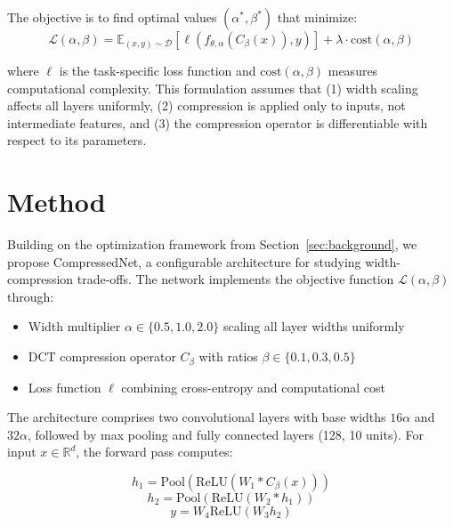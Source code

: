 \documentclass{article} %
\begin{document}
The objective is to find optimal values $(\alpha^*, \beta^*)$ that minimize:
\begin{equation}
    \mathcal{L}(\alpha, \beta) = \mathbb{E}_{(x,y)\sim\mathcal{D}}[\ell(f_{\theta,\alpha}(C_\beta(x)), y)] + \lambda \cdot \text{cost}(\alpha, \beta)
\end{equation}

where $\ell$ is the task-specific loss function and $\text{cost}(\alpha, \beta)$ measures computational complexity. This formulation assumes that (1) width scaling affects all layers uniformly, (2) compression is applied only to inputs, not intermediate features, and (3) the compression operator is differentiable with respect to its parameters.

\section{Method}
\label{sec:method}

Building on the optimization framework from Section~\ref{sec:background}, we propose CompressedNet, a configurable architecture for studying width-compression trade-offs. The network implements the objective function $\mathcal{L}(\alpha, \beta)$ through:

\begin{itemize}
    \item Width multiplier $\alpha \in \{0.5, 1.0, 2.0\}$ scaling all layer widths uniformly
    \item DCT compression operator $C_\beta$ with ratios $\beta \in \{0.1, 0.3, 0.5\}$
    \item Loss function $\ell$ combining cross-entropy and computational cost
\end{itemize}

The architecture comprises two convolutional layers with base widths $16\alpha$ and $32\alpha$, followed by max pooling and fully connected layers (128, 10 units). For input $x \in \mathbb{R}^d$, the forward pass computes:

\begin{equation}
    h_1 = \text{Pool}(\text{ReLU}(W_1 * C_\beta(x)))
\end{equation}
\begin{equation}
    h_2 = \text{Pool}(\text{ReLU}(W_2 * h_1))
\end{equation}
\begin{equation}
    y = W_4\text{ReLU}(W_3h_2)
\end{equation}
\end{document}
